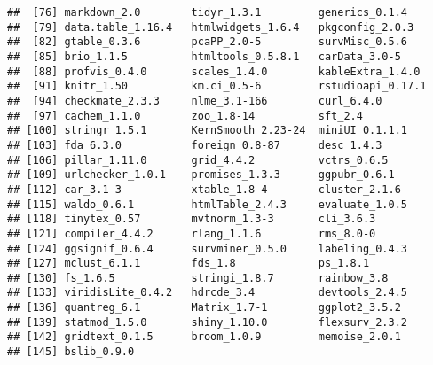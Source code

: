 \documentclass[
]{article}
\begin{document}
\begin{verbatim}
##  [76] markdown_2.0        tidyr_1.3.1         generics_0.1.4     
##  [79] data.table_1.16.4   htmlwidgets_1.6.4   pkgconfig_2.0.3    
##  [82] gtable_0.3.6        pcaPP_2.0-5         survMisc_0.5.6     
##  [85] brio_1.1.5          htmltools_0.5.8.1   carData_3.0-5      
##  [88] profvis_0.4.0       scales_1.4.0        kableExtra_1.4.0   
##  [91] knitr_1.50          km.ci_0.5-6         rstudioapi_0.17.1  
##  [94] checkmate_2.3.3     nlme_3.1-166        curl_6.4.0         
##  [97] cachem_1.1.0        zoo_1.8-14          sft_2.4            
## [100] stringr_1.5.1       KernSmooth_2.23-24  miniUI_0.1.1.1     
## [103] fda_6.3.0           foreign_0.8-87      desc_1.4.3         
## [106] pillar_1.11.0       grid_4.4.2          vctrs_0.6.5        
## [109] urlchecker_1.0.1    promises_1.3.3      ggpubr_0.6.1       
## [112] car_3.1-3           xtable_1.8-4        cluster_2.1.6      
## [115] waldo_0.6.1         htmlTable_2.4.3     evaluate_1.0.5     
## [118] tinytex_0.57        mvtnorm_1.3-3       cli_3.6.3          
## [121] compiler_4.4.2      rlang_1.1.6         rms_8.0-0          
## [124] ggsignif_0.6.4      survminer_0.5.0     labeling_0.4.3     
## [127] mclust_6.1.1        fds_1.8             ps_1.8.1           
## [130] fs_1.6.5            stringi_1.8.7       rainbow_3.8        
## [133] viridisLite_0.4.2   hdrcde_3.4          devtools_2.4.5     
## [136] quantreg_6.1        Matrix_1.7-1        ggplot2_3.5.2      
## [139] statmod_1.5.0       shiny_1.10.0        flexsurv_2.3.2     
## [142] gridtext_0.1.5      broom_1.0.9         memoise_2.0.1      
## [145] bslib_0.9.0
\end{verbatim}
\end{document}
